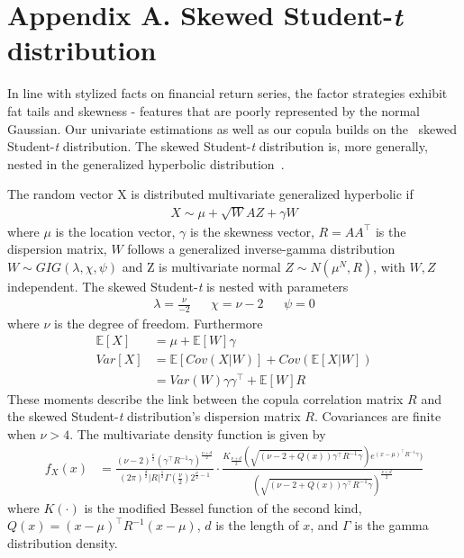 \appendix
\appendixpageoff
\section{Appendix A. Skewed Student-\textit{t} distribution} \label{App:AppendixA}
In line with stylized facts on financial return series, the factor strategies exhibit fat tails and skewness - features that are poorly represented by the normal Gaussian. Our univariate estimations as well as our copula builds on the~\textcite{Hansen1994} skewed Student-\textit{t} distribution. The skewed Student-\textit{t} distribution is, more generally, nested in the generalized hyperbolic distribution~\autocite{McNeilFreyEmbrecht2005}.

The random vector X is distributed multivariate generalized hyperbolic if
\begin{align}
    X \sim \mu + \sqrt{W} A Z + \gamma W
\end{align}
where $\mu$ is the location vector, $\gamma$ is the skewness vector, $R = A A^\top$ is the dispersion matrix, $W$ follows a generalized inverse-gamma distribution $W \sim GIG(\lambda, \chi, \psi)$ and Z is multivariate normal $Z \sim N(\mu^N, R)$, with $W, Z$ independent. The skewed Student-\textit{t} is nested with parameters
\begin{align}
    \lambda = \frac{\nu}{-2} && \chi = \nu - 2 && \psi = 0
\end{align}
where $\nu$ is the degree of freedom. Furthermore
\begin{align}
    \mathbb{E}[X] &= \mu + \mathbb{E}[W] \gamma \\
    Var[X] &= \mathbb{E}[Cov(X|W)] + Cov(\mathbb{E}[X|W]) \\
    &= Var(W) \gamma \gamma^\top + \mathbb{E}[W] R \nonumber
\end{align}
These moments describe the link between the copula correlation matrix $R$ and the skewed Student-\textit{t} distribution's dispersion matrix $R$. Covariances are finite when $\nu > 4$. The multivariate density function is given by
\begin{align} \label{eq:dskewt}
    f_X(x) &= \frac{(\nu - 2)^\frac{\nu}{2} (\gamma^\top R^{-1} \gamma)^{\frac{\nu+d}{2}}}{(2 \pi)^{\frac{d}{2}} |R|^\frac{1}{2} \Gamma (\frac{\nu}{2}) 2^{\frac{\nu}{2} - 1}} \cdot \frac{K_{\frac{\nu + d}{2}} ( \sqrt{(\nu - 2 + Q(x)) \gamma^\top R^{-1} \gamma}) e^{(x-\mu)^\top R^{-1} \gamma} )}{( \sqrt{(\nu - 2 + Q(x)) \gamma^\top R^{-1} \gamma})^{\frac{\nu + d}{2}}}
\end{align}
where $K(\cdot)$ is the modified Bessel function of the second kind, $Q(x) = (x-\mu)^\top R^{-1} (x-\mu)$, $d$ is the length of $x$, and $\Gamma$ is the gamma distribution density.

